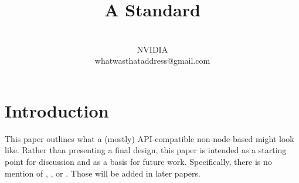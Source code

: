 \documentclass{article}
\begin{document}
\title{\textbf{\Large A Standard }}
\author{
  \\NVIDIA\\whatwasthataddress@gmail.com\\
}
\date{}
\maketitle


\section{Introduction}
\label{sec:intro}

This paper outlines what a (mostly) API-compatible non-node-based
 might look like.  Rather than presenting a final design, this
paper is intended as a starting point for discussion and as a basis for future
work.  Specifically, there is no mention of , , or
.  Those will be added in later papers.




\end{document}
